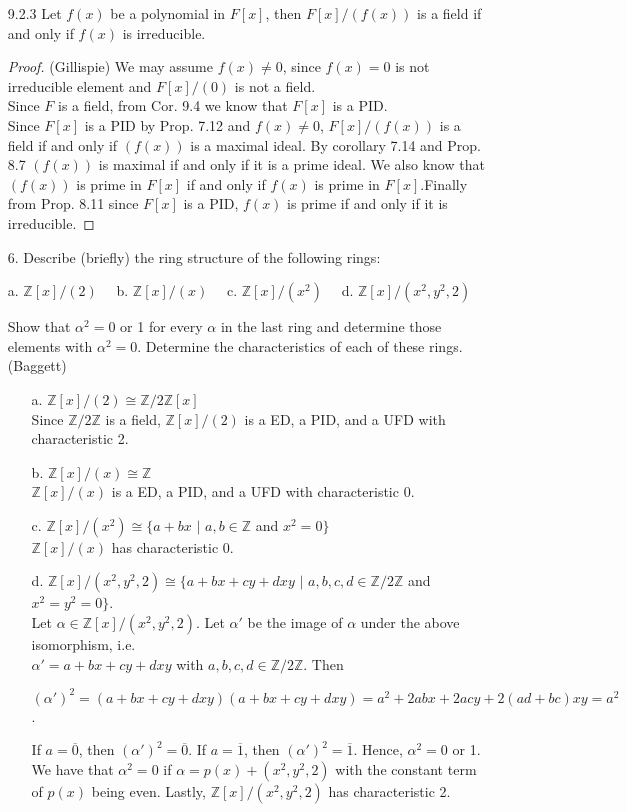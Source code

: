 \documentclass[10pt]{article}
\newcommand{\Z}{\mathbb{Z}}
\begin{document}
\begin{itemize}
\begin{proof}
\end{proof}

\item[9.2.3] Let $f(x)$ be a polynomial in $F[x]$,
then $F[x]/(f(x))$ is a field if and only if $f(x)$ is irreducible.

\begin{proof}

(Gillispie) We may assume $f(x) \neq 0$, since $f(x)=0$ is not
irreducible element and $F[x]/(0)$ is not a field.\\
Since $F$ is a field, from Cor. 9.4 we know that $F[x]$ is a PID.
\\
Since $F[x]$ is a PID by Prop. 7.12 and $f(x)\ne0$, $F[x]/(f(x))$ is
a field if and only if $(f(x))$ is a maximal ideal. By corollary
7.14 and Prop. 8.7 $(f(x))$ is maximal if and only if it is a prime
ideal. We also know that $(f(x))$ is prime in $F[x]$ if and only if
$f(x)$ is prime in $F[x]$.Finally from Prop. 8.11 since $F[x]$ is a
PID, $f(x)$ is prime if and only if it is irreducible.
\end{proof}

\item[6.] Describe (briefly) the ring structure of the following rings:
\begin{center}
a. $\Z[x]/(2)$ \ \ b. $\Z[x]/(x)$ \ \ c. $\Z[x]/(x^2)$ \ \ d.
$\Z[x]/(x^2,y^2,2)$
\end{center}
Show that $\alpha^2 = 0$ or 1 for every $\alpha$ in the last ring
and determine those elements with $\alpha^2 = 0$. Determine the
characteristics of each of these rings.
\\ (Baggett)

\begin{itemize}
\item[a.] $\Z[x]/(2) \cong \Z/2\Z[x]$
\\ Since $\Z/2\Z$ is a field, $\Z[x]/(2)$ is a ED, a PID, and a UFD with characteristic 2.
\item[b.] $\Z[x]/(x) \cong \Z$
\\ $\Z[x]/(x)$ is a ED, a PID, and a UFD with characteristic 0.
\item[c.] $\Z[x]/(x^2) \cong \{a + bx$ $|$ $a,b \in \Z$ and $x^2 = 0 \}$
\\ $\Z[x]/(x)$ has characteristic 0.
\item[d.] $\Z[x]/(x^2,y^2,2) \cong \{a + bx + cy + dxy$ $|$ $a,b,c,d \in \Z/2\Z$ and $x^2 = y^2 = 0 \}$.
\\ Let $\alpha \in \Z[x]/(x^2,y^2,2)$. Let $\alpha'$ be the image of $\alpha$ under the above isomorphism,
i.e.
\\ $\alpha' = a + bx + cy + dxy$ with $a,b,c,d \in \Z/2\Z$. Then
\begin{center}
$(\alpha')^2 = (a + bx + cy + dxy)(a + bx + cy + dxy) = a^2 + 2abx +
2acy + 2(ad + bc)xy = a^2$.
\end{center}
If $a = \overline{0}$, then $(\alpha')^2 = \overline{0}$. If $a =
\overline{1}$, then $(\alpha')^2 = \overline{1}$. Hence, $\alpha^2 =
0$ or 1. We have that $\alpha^2 = 0$ if $\alpha = p(x) +
(x^2,y^2,2)$ with the constant term of $p(x)$ being even. Lastly,
$\Z[x]/(x^2,y^2,2)$ has characteristic 2.


\end{itemize}
\end{itemize}
\end{document}
